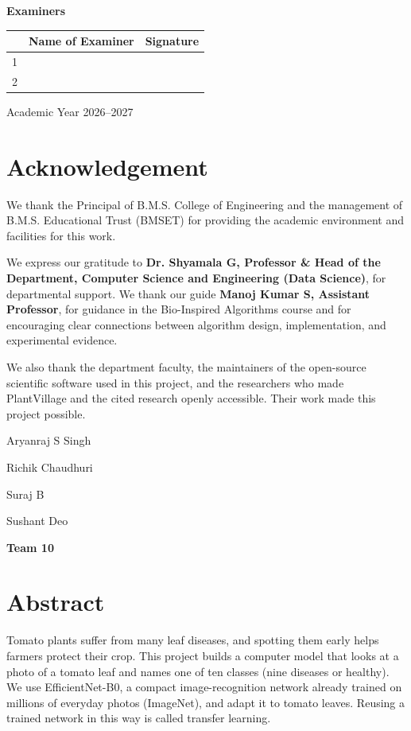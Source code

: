\textbf{Examiners}\par
\vspace{5pt}
\begin{tabularx}{\textwidth}{@{}c X X@{}}
\toprule & Name of Examiner & Signature\\\midrule
1 & & \\[12pt]
2 & & \\[12pt]\bottomrule
\end{tabularx}
\begin{center}Academic Year 2026--2027\end{center}
\normalsize\clearpage
\chapter*{Acknowledgement}
We thank the Principal of B.M.S. College of Engineering and the management of B.M.S. Educational Trust (BMSET) for providing the academic environment and facilities for this work.

We express our gratitude to \textbf{Dr. Shyamala G, Professor \& Head of the Department, Computer Science and Engineering (Data Science)}, for departmental support. We thank our guide \textbf{Manoj Kumar S, Assistant Professor}, for guidance in the Bio-Inspired Algorithms course and for encouraging clear connections between algorithm design, implementation, and experimental evidence.

We also thank the department faculty, the maintainers of the open-source scientific software used in this project, and the researchers who made PlantVillage and the cited research openly accessible. Their work made this project possible.

\vspace{18pt}
\begin{flushright}
Aryanraj S Singh\par
Richik Chaudhuri\par
Suraj B\par
Sushant Deo\par
\textbf{Team 10}
\end{flushright}
\clearpage
\chapter*{Abstract}
Tomato plants suffer from many leaf diseases, and spotting them early helps farmers protect their crop. This project builds a computer model that looks at a photo of a tomato leaf and names one of ten classes (nine diseases or healthy). We use EfficientNet-B0, a compact image-recognition network already trained on millions of everyday photos (ImageNet), and adapt it to tomato leaves. Reusing a trained network in this way is called transfer learning.

